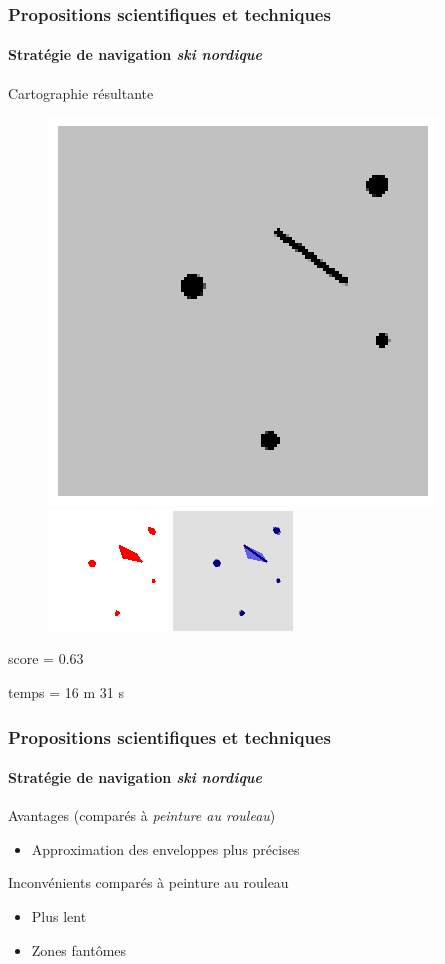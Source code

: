 \documentclass{beamer}
\begin{document}
			\begin{frame}
				\frametitle{Propositions scientifiques et techniques}
				\framesubtitle{Stratégie de navigation \textit{ski nordique}}
				Cartographie résultante
				\begin{figure}
					\centering
					\includegraphics[width=0.3\linewidth]{graphics/test_05_flip.png}
					\includegraphics[width=0.3\linewidth]{graphics/occupancy_grid_example_sn.png}
					\includegraphics[width=0.3\linewidth]{graphics/both_example_sn.png}
				\end{figure}
				score = 0.63

				temps = 16 m 31 s
			\end{frame}
			\begin{frame}
				\frametitle{Propositions scientifiques et techniques}
				\framesubtitle{Stratégie de navigation \textit{ski nordique}}
				\begin{exampleblock}{Avantages (comparés à \textit{peinture au rouleau})}
					\begin{itemize}
						\item Approximation des enveloppes plus précises
					\end{itemize}
				\end{exampleblock}
				\begin{alertblock}{Inconvénients comparés à peinture au rouleau}
					\begin{itemize}
						\item Plus lent
						\item Zones fantômes
					\end{itemize}
				\end{alertblock}
			\end{frame}
\end{document}
